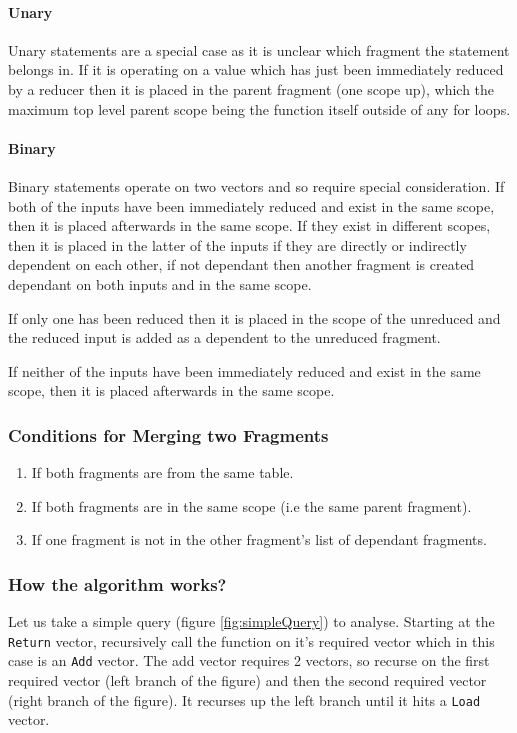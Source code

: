 \paragraph{Unary}

Unary statements are a special case as it is unclear which fragment the statement belongs in. If it is operating on a value which has just been immediately reduced by a reducer then it is placed in the parent fragment (one scope up), which the maximum top level parent scope being the function itself outside of any for loops. 

\paragraph{Binary}

Binary statements operate on two vectors and so require special consideration. 
If both of the inputs have been immediately reduced and exist in the same scope, then it is placed afterwards in the same scope. If they exist in different scopes, then it is placed in the latter of the inputs if they are directly or indirectly dependent on each other, if not dependant then another fragment is created dependant on both inputs and in the same scope.

If only one has been reduced then it is placed in the scope of the unreduced and the reduced input is added as a dependent to the unreduced fragment.

If neither of the inputs have been immediately reduced and exist in the same scope, then it is placed afterwards in the same scope. 


\subsubsection{Conditions for Merging two Fragments}
\begin{enumerate}
    \item If both fragments are from the same table.
    \item If both fragments are in the same scope (i.e the same parent fragment).
    \item If one fragment is not in the other fragment's list of dependant fragments.
\end{enumerate}

\subsubsection{How the algorithm works?}
Let us take a simple query (figure \ref{fig:simpleQuery}) to analyse. Starting at the \texttt{Return} vector, recursively call the function on it's required vector which in this case is an \texttt{Add} vector. The add vector requires 2 vectors, so recurse on the first required vector (left branch of the figure) and then the second required vector (right branch of the figure). It recurses up the left branch until it hits a \texttt{Load} vector.


